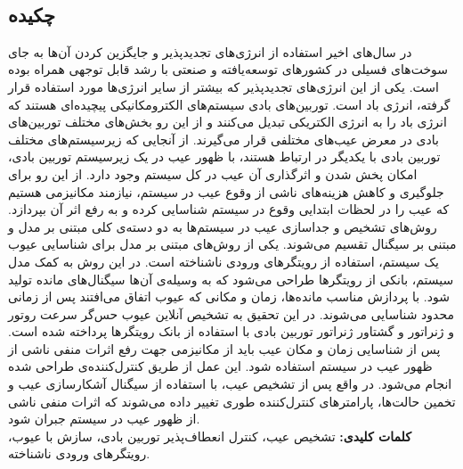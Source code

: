 
\setcounter{page}{1}
\thispagestyle{empty}

~\vfill

\subsection*{چکیده}
\begin{small}
\baselineskip=0.7cm

در سال‌های اخیر استفاده از انرژی‌های تجدید‌پذیر و جایگزین کردن آن‌ها به جای سوخت‌های فسیلی در کشور‌های توسعه‌یافته و صنعتی با رشد قابل توجهی همراه بوده است. یکی از این انرژی‌های تجدید‌پذیر که بیشتر از سایر انرژی‌ها مورد استفاده قرار گرفته، انرژی باد است. توربین‌های بادی سیستم‌های الکترومکانیکی پیچیده‌ای هستند که انرژی باد را به انرژی الکتریکی تبدیل می‌کنند و از این رو بخش‌های مختلف توربین‌های بادی در معرض عیب‌های مختلفی  قرار می‌گیرند. از آنجایی‌ که زیر‌سیستم‌های مختلف توربین بادی با یکدیگر در ارتباط هستند، با ظهور عیب در یک زیر‌سیستم توربین بادی، امکان پخش شدن و اثر‌گذاری آن عیب در کل سیستم وجود دارد. از این رو برای جلوگیری و کاهش هزینه‌های ناشی از وقوع عیب در سیستم، نیازمند مکانیزمی هستیم که عیب را در لحظات ابتدایی وقوع در سیستم شناسایی کرده و به رفع اثر آن بپردازد. روش‌های تشخیص و جداسازی عیب در سیستم‌ها به دو دسته‌ی کلی مبتنی بر مدل و مبتنی بر سیگنال تقسیم می‌شوند. یکی از روش‌های مبتنی بر مدل برای شناسایی عیوب یک سیستم، استفاده از رویتگر‌های ورودی ناشناخته است. در این روش به کمک مدل سیستم، بانکی از رویتگر‌ها طراحی می‌شود که به وسیله‌ی آن‌ها سیگنال‌های مانده تولید شود. با پردازش مناسب مانده‌ها، زمان و مکانی که عیوب اتفاق می‌افتند پس از زمانی محدود شناسایی می‌شوند. در این تحقیق به تشخیص آنلاین عیوب حس‌گر سرعت روتور و ژنراتور و گشتاور ژنراتور توربین بادی با استفاده از بانک رویتگر‌ها پرداخته شده است. پس از شناسایی زمان و مکان عیب باید از مکانیزمی جهت رفع اثرات منفی ناشی از ظهور عیب در سیستم استفاده شود. این عمل از طریق کنترل‌کننده‌ی  طراحی شده انجام می‌شود. در واقع پس از تشخیص عیب، با استفاده از سیگنال آشکارسازی عیب و تخمین حالت‌ها، پارامتر‌های کنترل‌کننده طوری تغییر داده می‌شوند که اثرات منفی ناشی از ظهور عیب در سیستم جبران شود.\\

\noindent\textbf{کلمات کلیدی:} تشخیص عیب، کنترل انعطاف‌پذیر توربین بادی، سازش با عیوب، رویتگر‌های ورودی ناشناخته.
\end{small}